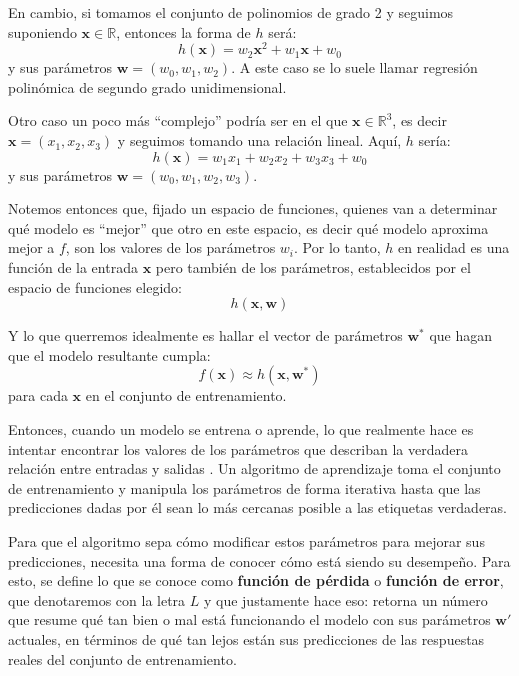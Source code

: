 \documentclass[../../main.tex]{subfiles}
\begin{document}
En cambio, si tomamos el conjunto de polinomios de grado 2 y seguimos suponiendo
\(\bm{x} \in \mathbb{R}\), entonces la forma de \(h\) será:
\[h(\bm{x}) = w_2 \bm{x}^2 + w_1 \bm{x} + w_0\] y sus parámetros
\(\bm{w}=(w_0, w_1, w_2)\). A este caso se lo suele llamar regresión polinómica de segundo
grado unidimensional.

Otro caso un poco más ``complejo'' podría ser en el que \(\bm{x} \in \mathbb{R}^3\), es decir
\(\bm{x}=(x_1, x_2, x_3)\) y seguimos tomando una relación lineal. Aquí, \(h\) sería:
\[h(\bm{x}) = w_1 x_1 + w_2 x_2 + w_3 x_3 + w_0\] y sus parámetros \(\bm{w}=(w_0, w_1,
w_2, w_3)\)\footnotemark. 

Notemos entonces que, fijado un espacio de funciones, quienes van a determinar qué modelo
es ``mejor'' que otro en este espacio, es decir qué modelo aproxima mejor a \(f\), son los
valores de los parámetros \(w_i\). Por lo tanto, \(h\) en realidad es una función de la
entrada \(\bm{x}\) pero también de los parámetros, establecidos por el espacio de funciones
elegido:
\[h(\bm{x}, \bm{w})\]

Y lo que querremos idealmente es hallar el vector de parámetros \(\bm{w}^*\) que hagan que
el modelo resultante cumpla:
\[f(\bm{x}) \approx h(\bm{x}, \bm{w}^*)\]
para cada \(\bm{x}\) en el conjunto de entrenamiento.

Entonces, cuando un modelo se entrena o aprende, lo que realmente hace es intentar
encontrar los valores de los parámetros que describan la verdadera relación entre entradas
y salidas \cite{prince2024understanding}. Un algoritmo de aprendizaje toma el conjunto de
entrenamiento y manipula los parámetros de forma iterativa hasta que las predicciones
dadas por él sean lo más cercanas posible a las etiquetas verdaderas.

Para que el algoritmo sepa cómo modificar estos parámetros para mejorar sus predicciones,
necesita una forma de conocer cómo está siendo su desempeño. Para esto, se define lo que se
conoce como \textbf{función de pérdida} o \textbf{función de error}, que denotaremos con
la letra \(L\) y que justamente hace eso: retorna un número que resume qué tan bien o mal
está funcionando el modelo con sus parámetros \(\bm{w}'\) actuales, en términos de qué tan
lejos están sus predicciones de las respuestas reales del conjunto de entrenamiento.
\end{document}
